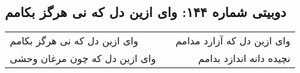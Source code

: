 \begin{center}
\section*{دوبیتی شماره ۱۴۴: وای ازین دل که نی هرگز بکامم}
\label{sec:144}
\begin{longtable}{l p{0.5cm} r}
وای ازین دل که نی هرگز بکامم
&&
وای ازین دل که آزارد مدامم
\\
وای ازین دل که چون مرغان وحشی
&&
نچیده دانه اندازد بدامم
\\
\end{longtable}
\end{center}
